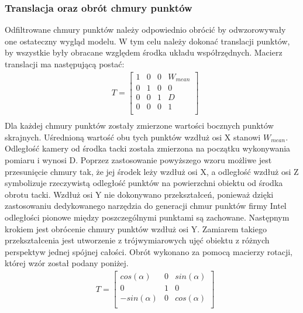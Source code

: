 \subsubsection{Translacja oraz obrót chmury punktów}
Odfiltrowane chmury punktów należy odpowiednio obrócić by odwzorowywały one ostateczny wygląd modelu. W tym celu należy dokonać translacji punktów, by wszystkie były obracane względem środka układu współrzędnych. Macierz translacji ma następującą postać:
\begin{equation}
    \begin{aligned}
        &T=\begin{bmatrix}
                1 &0 & 0&W_{mean}\\
                 0 &1 & 0&0\\
                0 &0 & 1&D\\
                0 &0 & 0&1\\
            \end{bmatrix}\\
    \end{aligned}
    \label{equ:wielomianowaEqu}
\end{equation}
\indent Dla każdej chmury punktów zostały zmierzone wartości bocznych punktów skrajnych. Uśrednioną wartość obu tych punktów wzdłuż osi X stanowi $W_{mean}$. Odległość kamery od środka tacki została zmierzona na początku wykonywania pomiaru i wynosi D.
\newline \indent Poprzez zastosowanie powyższego wzoru możliwe jest przesunięcie chmury tak, że jej środek leży wzdłuż osi X, a odległość wzdłuż osi Z symbolizuje rzeczywistą odległość punktów na powierzchni obiektu od środka obrotu tacki. Wzdłuż osi Y nie dokonywano przekształceń, ponieważ dzięki zastosowaniu dedykowanego narzędzia do generacji chmur punktów firmy Intel odległości pionowe między poszczególnymi punktami są zachowane.
\newline \indent Następnym krokiem jest obrócenie chmury punktów wzdłuż osi Y. Zamiarem takiego przekształcenia jest utworzenie z trójwymiarowych ujęć obiektu z różnych perspektyw jednej spójnej całości. Obrót wykonano za pomocą macierzy rotacji, której wzór został podany poniżej. 
\begin{equation}
    \begin{aligned}
        &T=\begin{bmatrix}
                cos(\alpha) &0 & sin(\alpha)\\
                 0 &1 & 0\\
                -sin(\alpha) &0 & cos(\alpha)\\
            \end{bmatrix}\\
    \end{aligned}
    \label{equ:wielomianowaEqu}
\end{equation}
